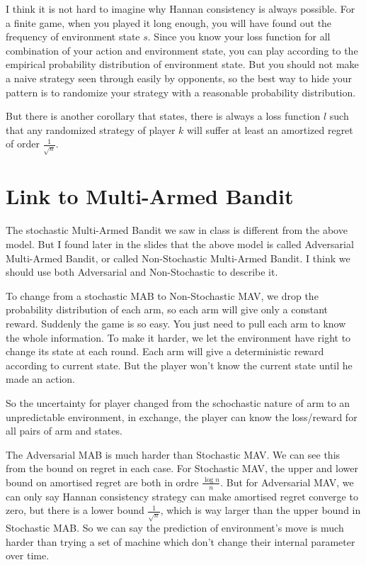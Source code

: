 \documentclass{article} %
\begin{document}
I think it is not hard to imagine why Hannan consistency is always possible. For a finite game, when you played it long enough, you will have found out the frequency of environment state $s$. Since you know your loss function for all combination of your action and environment state, you can play according to the empirical probability distribution of environment state. But you should not make a naive strategy seen through easily by opponents, so the best way to hide your pattern is to randomize your strategy with a reasonable probability distribution.

But there is another corollary that states, there is always a loss function $l$ such that any randomized strategy of player $k$ will suffer at least an amortized regret of order $\frac{1}{\sqrt{n}}$.

\section{Link to Multi-Armed Bandit}
The stochastic Multi-Armed Bandit we saw in class is different from the above model. But I found later in the slides that the above model is called Adversarial Multi-Armed Bandit, or called Non-Stochastic Multi-Armed Bandit. I think we should use both Adversarial and Non-Stochastic to describe it. 

To change from a stochastic MAB to Non-Stochastic MAV, we drop the probability distribution of each arm, so each arm will give only a constant reward. Suddenly the game is so easy. You just need to pull each arm to know the whole information. To make it harder, we let the environment have right to change its state at each round. Each arm will give a deterministic reward according to current state. But the player won't know the current state until he made an action.

So the uncertainty for player changed from the schochastic nature of arm to an unpredictable environment, in exchange, the player can know the loss/reward for all pairs of arm and states.

The Adversarial MAB is much harder than Stochastic MAV. We can see this from the bound on regret in each case. For Stochastic MAV, the upper and lower bound on amortised regret are both in ordre $\frac{\log{n}}{n}$. But for Adversarial MAV, we can only say Hannan consistency strategy can make amortised regret converge to zero, but there is a lower bound $\frac{1}{\sqrt{n}}$, which is way larger than the upper bound in Stochastic MAB. So we can say the prediction of environment's move is much harder than trying a set of machine which don't change their internal parameter over time.
\end{document}
